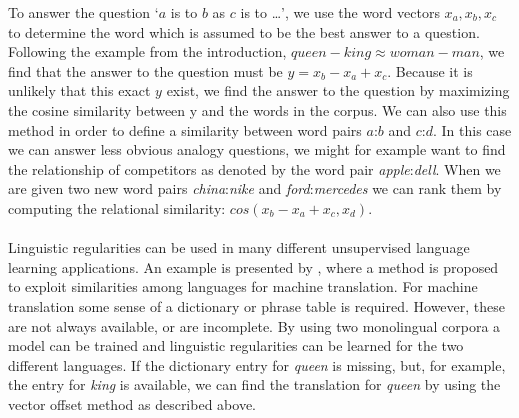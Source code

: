 \documentclass[11pt]{article}
\begin{document}
To answer the question `$a$ is to $b$ as $c$ is to \dots', we use the word vectors $x_a, x_b, x_c$ to determine the word which is assumed to be the best answer to a question. Following the example from the introduction, $\textit{queen} - \textit{king} \approx \textit{woman}  -\textit{man}$, we find that the answer to the question must be $y = x_b - x_a + x_c$. Because it is unlikely that this exact $y$ exist, we find the answer to the question by maximizing the cosine similarity between y and the words in the corpus. We can also use this method in order to define a similarity between word pairs $a$:$b$ and $c$:$d$. In this case we can answer less obvious analogy questions, we might for example want to find the relationship of competitors as denoted by the word pair \textit{apple}:\textit{dell}. When we are given two new word pairs \textit{china}:\textit{nike} and \textit{ford}:\textit{mercedes} we can rank them by computing the relational similarity: $cos(x_b - x_a + x_c, x_d)$.\\\\
Linguistic regularities can be used in many different unsupervised language learning applications. An example is presented by \cite{MikolovMT:13}, where a method is proposed to exploit similarities among languages for machine translation. For machine translation some sense of a dictionary or phrase table is required. However, these are not always available, or are incomplete. By using two monolingual corpora a model can be trained and linguistic regularities can be learned for the two different languages. If the dictionary entry for \textit{queen} is missing, but, for example, the entry for \textit{king} is available, we can find the translation for \textit{queen} by using the vector offset method as described above.
\end{document}
